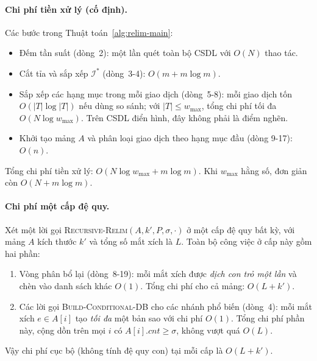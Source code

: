 \documentclass[12pt,a4paper]{report}
\begin{document}
\paragraph{Chi phí tiền xử lý (cố định).}
Các bước trong Thuật toán~\ref{alg:relim-main}:
\begin{itemize}
    \item Đếm tần suất (dòng~2): một lần quét toàn bộ CSDL với $O(N)$ thao tác.
    \item Cắt tỉa và sắp xếp $\mathcal{I}^*$ (dòng~3-4): $O(m + m\log m)$.
    \item Sắp xếp các hạng mục trong mỗi giao dịch (dòng~5-8): mỗi giao dịch
    tốn $O(|T|\log|T|)$ nếu dùng so sánh; với $|T| \leq w_{\max}$, tổng chi phí
    tối đa $O(N \log w_{\max})$. Trên CSDL điển hình, đây không phải là điểm
    nghẽn.
    \item Khởi tạo mảng $A$ và phân loại giao dịch theo hạng mục đầu (dòng
    9-17): $O(n)$.
\end{itemize}
\noindent
Tổng chi phí tiền xử lý: $\boxed{O(N\log w_{\max} + m\log m)}$. Khi $w_{\max}$
hằng số, đơn giản còn $O(N + m\log m)$.

\paragraph{Chi phí một cấp đệ quy.}
Xét một lời gọi \textsc{Recursive-Relim}$(A, k', P, \sigma, \cdot)$ ở một cấp
đệ quy bất kỳ, với mảng $A$ kích thước $k'$ và tổng số mắt xích là $L$. Toàn bộ
công việc ở cấp này gồm hai phần:
\begin{enumerate}
    \item[(R1)] Vòng phân bổ lại (dòng~8-19): mỗi mắt xích được \textit{dịch
    con trỏ một lần} và chèn vào danh sách khác $O(1)$. Tổng chi phí cho cả
    mảng: $O(L + k')$.
    \item[(R2)] Các lời gọi \textsc{Build-Conditional-DB} cho các nhánh phổ
    biến (dòng~4): mỗi mắt xích $e \in A[i]$ tạo \textit{tối đa} một bản sao
    với chi phí $O(1)$. Tổng chi phí phần này, cộng dồn trên mọi $i$ có
    $A[i].\mathit{cnt} \geq \sigma$, không vượt quá $O(L)$.
\end{enumerate}
\noindent
Vậy chi phí cục bộ (không tính đệ quy con) tại mỗi cấp là $O(L + k')$.
\end{document}
